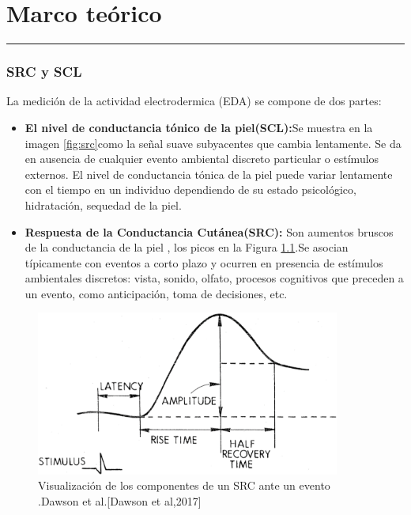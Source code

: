 \chapter{Marco teórico }

\hrule \bigskip \vspace*{1cm}

\subsection{SRC y SCL}


La medición de la actividad electrodermica (EDA)  se compone de  dos partes: 

 
\begin{itemize}
    \item \textbf{El nivel de conductancia tónico de la piel(SCL):}Se muestra en la imagen \ref{fig:src}como la señal suave subyacentes que cambia lentamente.
    Se da en ausencia de cualquier evento ambiental discreto particular o estímulos externos. El nivel de conductancia tónica de la piel puede variar lentamente con el tiempo en un individuo dependiendo de su estado psicológico, hidratación, sequedad de la piel.
    \item \textbf{Respuesta  de la Conductancia Cutánea(SRC):}
     Son aumentos bruscos de la conductancia de la piel ,  los picos  en  la Figura \ref{fig:src2}.Se asocian típicamente con eventos a corto plazo y ocurren en presencia de estímulos ambientales discretos: vista, sonido, olfato, procesos cognitivos que preceden a un evento, como anticipación, toma de decisiones, etc. 
\end{itemize}

\begin{figure}[h]
    \centering
    \includegraphics[width=10cm]{Graficos/senal.png}
    \caption{ Visualización de los componentes de un SRC ante un evento .Dawson et al.[Dawson et al,2017] }
    \label{fig:src2}
\end{figure}

